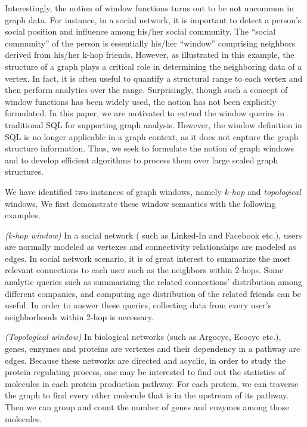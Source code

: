 Interestingly, the notion of window functions turns out to be not uncommon
in graph data. For instance, in a social network, it is important to detect 
a person's social position and influence among his/her social community. 
The ``social community'' of the person is essentially his/her ``window'' 
comprising neighbors derived from his/her k-hop friends.
However, as illustrated in this example, the structure of a graph
plays a critical role in determining the neighboring data of a vertex.
In fact, it is often useful to quantify a structural range to each vertex 
and then perform analytics over the range. 
Surprisingly, though such a concept of window functions has been widely
used, the notion has not been explicitly formulated. 
In this paper, we are motivated to extend the window queries in traditional 
SQL for supporting graph analysis. However, the window definition in 
SQL is no longer applicable in a graph context, as it does not capture 
the graph structure information.
Thus, we seek to formulate the notion of graph windows and to develop
efficient algorithms to process them over large scaled graph structures. 

We have identified two instances of graph windows, namely 
$k${\em -hop} and {\em topological} windows. 
We first demonstrate these window semantics with the following examples. 
\begin{example}
\label{query:linkedin-2-hop-window}
\emph{(k-hop window)} In a social network ( such as Linked-In and Facebook etc.), users are normally modeled as vertexes and connectivity relationships are modeled as edges. In social network scenario, it is of great interest to summarize the most relevant connections to each user such as the neighbors within 2-hops. Some analytic queries such as summarizing the related connections' distribution among different companies, and computing age distribution of the related friends can be useful. In order to answer these queries, collecting data from every user's neighborhoods within 2-hop is necessary.
\end{example}

\begin{example}
\label{query:bio-dag-window}
\emph{(Topological window)} In biological networks (such as Argocyc, Ecocyc etc.\cite{keseler2005ecocyc}), genes, enzymes and proteins are vertexes and their dependency in a pathway are edges. Because these networks are directed 
and acyclic, in order to study the protein regulating process, one may be 
interested to find out the statistics of molecules in each protein 
production pathway. For each protein, we can traverse the graph to find 
every other molecule that is in the upstream of its pathway. Then we can group and count the number of genes and enzymes among those molecules. 
\end{example}

